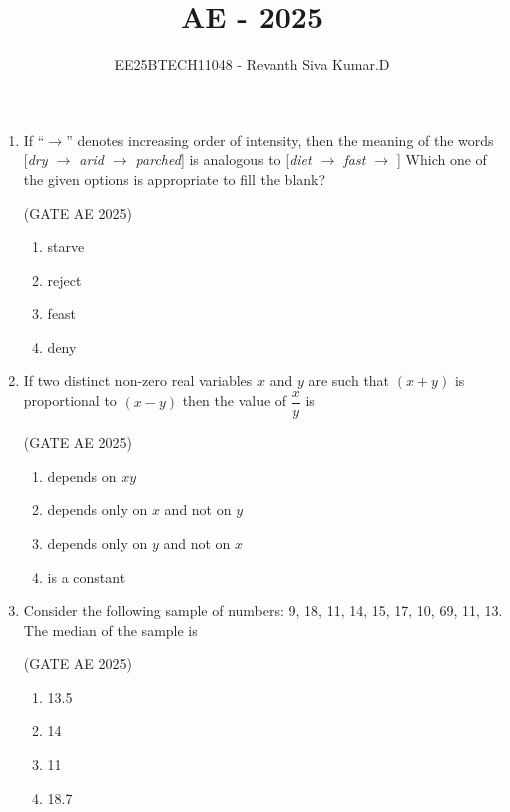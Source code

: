 \documentclass[journal,12pt,onecolumn]{IEEEtran}
\title{\LARGE \textbf{AE - 2025}}
\author{\Large EE25BTECH11048 - Revanth Siva Kumar.D}
\date{}
\theoremstyle{remark}
\begin{document}
\maketitle
\begin{flushleft}

\begin{enumerate}

\item If ``$\rightarrow$'' denotes increasing order of intensity, then the meaning of the words 
[\textit{dry $\rightarrow$ arid $\rightarrow$ parched}] is analogous to [\textit{diet $\rightarrow$ fast $\rightarrow$ \underline{\hspace{1.5cm}}}] 
Which one of the given options is appropriate to fill the blank?

\hfill(GATE AE 2025)

\begin{enumerate}
    \item starve
    \item reject
    \item feast
    \item deny
\end{enumerate}

\item If two distinct non-zero real variables $x$ and $y$ are such that $(x + y)$ is proportional to $(x - y)$ then the value of $\dfrac{x}{y}$ is

\hfill(GATE AE 2025)

\begin{enumerate}
    \item depends on $xy$ 
    \item depends only on $x$ and not on $y$
    \item depends only on $y$ and not on $x$ 
    \item is a constant
\end{enumerate}

\item Consider the following sample of numbers: 9, 18, 11, 14, 15, 17, 10, 69, 11, 13. The median of the sample is

\hfill(GATE AE 2025)

\begin{enumerate}
    \item 13.5
    \item 14
    \item 11
    \item 18.7
\end{enumerate}


\end{enumerate}
\end{flushleft}
\end{document}
